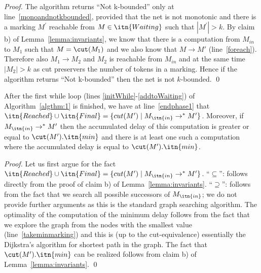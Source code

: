 \begin{proof}%
The algorithm returns ``Not k-bounded''  only at line~\ref{monoandnotkbounded},
provided that the net is not monotonic and there is a 
  marking $M^\prime$ reachable from $M \in \itn{Waiting}$ such
	that $|M^\prime| > k$. 
	By claim b) of Lemma~\ref{lemma:invariants}, we know 
	that there is a computation from $M_{in}$ to $M_1$
    such that  $M=\cut(M_1)$ and we also know that 
		$M \rightarrow M'$ (line~\ref{foreach}). 
              Therefore also $M_1 \rightarrow M_2$ and $M_2$ 
         is reachable from $M_{in}$ and at the same time $|M_2| > k$
    as cut preservers the number of tokens in a marking.
     Hence if the algorithm returns ``Not k-bounded'' then 
     the net is not $k$-bounded.
\qed
\end{proof}

\begin{lemma}
	\label{alg1:reachcutmarkings}
	After the first while loop (lines \ref{initWhile}-\ref{addtoWaiting}) of Algorithm~\ref{algthm:1} is finished, we have at line~\ref{endphase1} 
that $\itn{Reached} \cup \itn{Final}=\{cut(M^\prime) \mid M_\itn{in} \rightarrow^* M^\prime\}$. Moreover, if $M_\itn{in} \rightarrow^* M'$ then the accumulated delay
of this computation is greater or equal to $\cut(M').\itn{min}$ and there
is at least one such a computation where the accumulated delay is
equal to $\cut(M').\itn{min}$. 
\end{lemma}
\begin{proof}%
Let us first argue for the fact  $\itn{Reached} \cup \itn{Final}=\{cut(M^\prime) \mid M_\itn{in} \rightarrow^* M^\prime\}$.
``$\subseteq$'': follows directly from the proof of claim b) 
of Lemma~\ref{lemma:invariants}. ``$\supseteq$'': follows from the fact
that we search all possible successors of $M_\itn{in}$; we do not provide 
further arguments as this is the standard graph searching algorithm.
The optimality of the computation of the minimum delay follows from the fact
that we explore the graph from the nodes with the smallest  value
(line~\ref{takeminmarking}) and this is (up to the cut-equivalence) essentially 
the Dijkstra's algorithm for shortest path in the graph. The fact
that $\cut(M').\itn{min}$ can be realized follows from
claim b) of Lemma~\ref{lemma:invariants}.
\qed
\end{proof}

